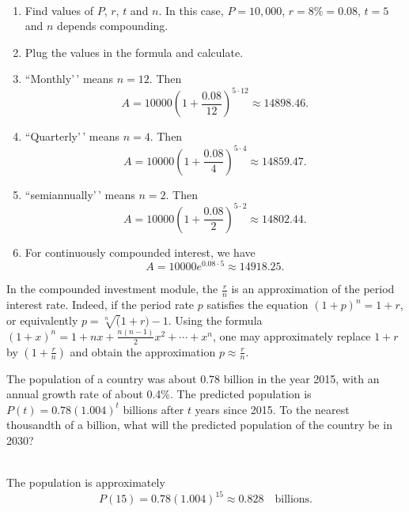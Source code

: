 \documentclass[
  en,11pt]{elegantbook}
\newcommand{\size}[2]{{\fontsize{#1}{0}\selectfont#2}}
\newenvironment{rmdnote}{
	\vspace*{0.5\baselineskip}
    \par\noindent
    \makebox[-3pt][r]{\color{red!90}\size{8}{\textdbend}\,\,}
    \begin{tcolorbox}[
    title={\textbf{\color{second}Note}},
    title style={left color=blue!10!green!20!white,right color=yellow!20!blue!20!white},
    colback=red!10!white,
    ]
    \itshape
}{
    \end{tcolorbox}
    \par\ignorespacesafterend
}
\let\BeginKnitrBlock\begin \let\EndKnitrBlock\end
\begin{document}
\BeginKnitrBlock{solution}
{}\\

\begin{enumerate}
\def\labelenumi{\arabic{enumi}.}

\item
  Find values of \(P\), \(r\), \(t\) and \(n\). In this case, \(P=10,000\), \(r=8\%=0.08\), \(t=5\) and \(n\) depends compounding.
\item
  Plug the values in the formula and calculate.
\item
  ``Monthly'\,' means \(n=12\). Then
  \[
   A=10000\left(1+\frac{0.08}{12}\right)^{5\cdot 12}\approx 14898.46.
   \]
\item
  ``Quarterly'\,' means \(n=4\). Then
  \[
   A=10000\left(1+\frac{0.08}{4}\right)^{5\cdot 4}\approx 14859.47.
   \]
\item
  ``semiannually'\,' means \(n=2\). Then
  \[
   A=10000\left(1+\frac{0.08}{2}\right)^{5\cdot 2}\approx 14802.44.
   \]
\item
  For continuously compounded interest, we have
  \[
   A=10000e^{0.08\cdot 5}\approx 14918.25.
   \]
\end{enumerate}
\EndKnitrBlock{solution}

\begin{rmdnote}

In the compounded investment module, the \(\frac rn\) is an approximation of the period interest rate. Indeed, if the period rate \(p\) satisfies the equation \((1+p)^n=1+r\), or equivalently \(p=\sqrt[n](1+r) - 1\). Using the formula \((1+x)^n=1+nx+\frac{n(n-1)}{2}x^2+\cdots +x^n\), one may approximately replace \(1+r\) by \((1+\frac rn)\) and obtain the approximation \(p\approx \frac rn\).

\end{rmdnote}

\BeginKnitrBlock{example}
\protect\hypertarget{exm:unnamed-chunk-283}{}{\label{exm:unnamed-chunk-283} }
The population of a country was about 0.78 billion in the year 2015, with an annual growth rate of about 0.4\%.
The predicted population is \(P(t)=0.78(1.004)^t\) billions after \(t\) years since 2015.
To the nearest thousandth of a billion, what will the predicted population of the country be in 2030?
\EndKnitrBlock{example}

\BeginKnitrBlock{solution}
{}\\

The population is approximately
\[
P(15)=0.78(1.004)^{15}\approx 0.828 \quad \text{billions}.
\]
\EndKnitrBlock{solution}
\end{document}
